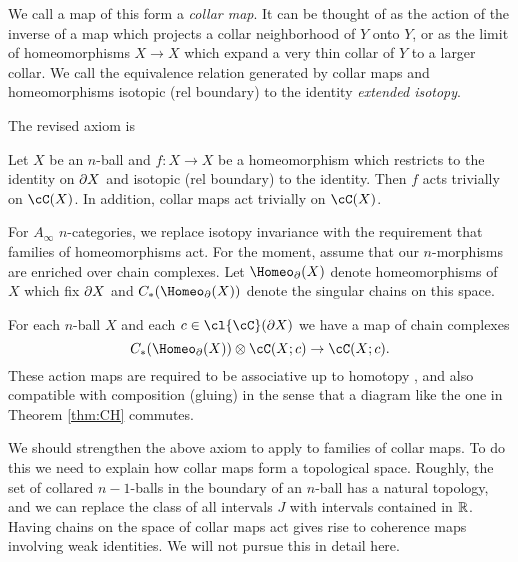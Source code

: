 We call a map of this form a {\it collar map}.
It can be thought of as the action of the inverse of
a map which projects a collar neighborhood of $Y$ onto $Y$,
or as the limit of homeomorphisms $X\to X$ which expand a very thin collar of $Y$
to a larger collar.
We call the equivalence relation generated by collar maps and homeomorphisms
isotopic (rel boundary) to the identity {\it extended isotopy}.

The revised axiom is

\addtocounter{axiom}{-1}
\begin{axiom}
\label{axiom:extended-isotopies}
Let $X$ be an $n$-ball and $f: X\to X$ be a homeomorphism which restricts
to the identity on $\partial X$ and isotopic (rel boundary) to the identity.
Then $f$ acts trivially on $\cC(X)$.
In addition, collar maps act trivially on $\cC(X)$.
\end{axiom}

\smallskip

For $A_\infty$ $n$-categories, we replace
isotopy invariance with the requirement that families of homeomorphisms act.
For the moment, assume that our $n$-morphisms are enriched over chain complexes.
Let $\Homeo_\bd(X)$ denote homeomorphisms of $X$ which fix $\partial X$ and
$C_*(\Homeo_\bd(X))$ denote the singular chains on this space.


\addtocounter{axiom}{-1}
\begin{axiom}
For each $n$-ball $X$ and each $c\in \cl{\cC}(\bd X)$ we have a map of chain complexes
\[
	C_*(\Homeo_\bd(X))\ot \cC(X; c) \to \cC(X; c) .
\]
These action maps are required to be associative up to homotopy
, and also compatible with composition (gluing) in the sense that
a diagram like the one in Theorem \ref{thm:CH} commutes.
\end{axiom}

We should strengthen the above axiom to apply to families of collar maps.
To do this we need to explain how collar maps form a topological space.
Roughly, the set of collared $n{-}1$-balls in the boundary of an $n$-ball has a natural topology,
and we can replace the class of all intervals $J$ with intervals contained in $\mathbb{R}$.
Having chains on the space of collar maps act gives rise to coherence maps involving
weak identities.
We will not pursue this in detail here.

